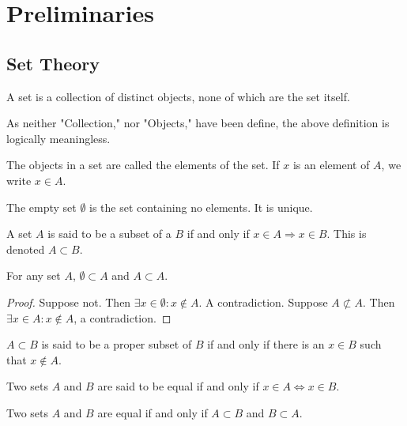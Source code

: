 \documentclass[crop=false,class=article,oneside]{standalone}
\begin{document}
    \ifx\ifworkmasterswork\undefined
        \section*{Preliminaries}
        \setcounter{section}{1}
    \fi
    \subsection{Set Theory}
        \begin{definition}
        A set is a collection of distinct objects, none of which are the set itself.
        \end{definition}
        \begin{remark}
        As neither "Collection," nor "Objects," have been define, the above definition is logically meaningless.
        \end{remark}
        \begin{definition}
        The objects in a set are called the elements of the set. If $x$ is an element of $A$, we write $x\in A$.
        \end{definition}
        \begin{definition}
        The empty set $\emptyset$ is the set containing no elements. It is unique.
        \end{definition}
        \begin{definition}
        A set $A$ is said to be a subset of a $B$ if and only if $x\in A\Rightarrow x\in B$. This is denoted $A\subset B$.
        \end{definition}
        \begin{corollary}
        For any set $A$, $\emptyset \subset A$ and $A\subset A$.
        \end{corollary}
        \begin{proof}
        Suppose not. Then $\exists x\in \emptyset: x\notin A$. A contradiction. Suppose $A\not\subset A$. Then $\exists x\in A:x\notin A$, a contradiction.
        \end{proof}
        \begin{definition}
        $A\subset B$ is said to be a proper subset of $B$ if and only if there is an $x\in B$ such that $x\notin A$.
        \end{definition}
        \begin{definition}
        Two sets $A$ and $B$ are said to be equal if and only if $x\in A \Leftrightarrow x\in B$.
        \end{definition}
        \begin{theorem}
        Two sets $A$ and $B$ are equal if and only if $A\subset B$ and $B\subset A$.
        \end{theorem}
\end{document}
